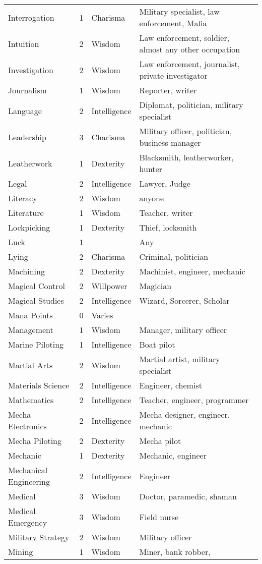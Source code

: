 \documentclass[twoside]{book}
\begin{document}
\begin{longtable}{p{1.25in}llp{12em}}
      \raggedright  Interrogation& 1& Charisma& Military specialist, law
           enforcement, Mafia\tabularnewline
      \raggedright  Intuition& 2& Wisdom& Law enforcement, soldier,
           almost any other occupation\tabularnewline
      \raggedright  Investigation& 2& Wisdom& Law enforcement,
           journalist, private investigator\tabularnewline
      \raggedright  Journalism& 1& Wisdom& Reporter, writer\tabularnewline
      \raggedright  Language& 2& Intelligence& Diplomat, politician,
           military specialist\tabularnewline
      \raggedright  Leadership& 3& Charisma& Military officer,
           politician, business manager\tabularnewline
      \raggedright  Leatherwork& 1& Dexterity& Blacksmith,
           leatherworker, hunter\tabularnewline
      \raggedright  Legal& 2& Intelligence& Lawyer, Judge\tabularnewline
      \raggedright  Literacy& 2& Wisdom& anyone\tabularnewline
      \raggedright  Literature& 1& Wisdom& Teacher, writer\tabularnewline
      \raggedright  Lockpicking& 1& Dexterity& Thief, locksmith\tabularnewline
      \raggedright  Luck& 1& & Any\tabularnewline
      \raggedright  Lying& 2& Charisma& Criminal, politician\tabularnewline
      \raggedright  Machining& 2& Dexterity& Machinist, engineer,
           mechanic\tabularnewline
      \raggedright  Magical Control& 2& Willpower& Magician\tabularnewline
      \raggedright  Magical Studies& 2& Intelligence& Wizard, Sorcerer, Scholar\tabularnewline
      \raggedright  Mana Points& 0& Varies&\tabularnewline
      \raggedright  Management& 1& Wisdom& Manager, military officer\tabularnewline
      \raggedright  Marine Piloting& 1& Intelligence& Boat pilot\tabularnewline
      \raggedright  Martial Arts& 2& Wisdom& Martial artist, military
           specialist\tabularnewline
      \raggedright  Materials Science& 2& Intelligence& Engineer, chemist\tabularnewline
      \raggedright  Mathematics& 2& Intelligence& Teacher, engineer,
           programmer\tabularnewline
      \raggedright  Mecha Electronics& 2& Intelligence& Mecha designer, engineer,
           mechanic\tabularnewline
      \raggedright  Mecha Piloting& 2& Dexterity& Mecha pilot\tabularnewline
      \raggedright  Mechanic& 1& Dexterity& Mechanic, engineer\tabularnewline
      \raggedright  Mechanical Engineering& 2& Intelligence& Engineer\tabularnewline
      \raggedright  Medical& 3& Wisdom& Doctor, paramedic, shaman\tabularnewline
      \raggedright  Medical Emergency& 3& Wisdom& Field nurse\tabularnewline
      \raggedright  Military Strategy& 2& Wisdom& Military officer\tabularnewline
      \raggedright  Mining& 1& Wisdom& Miner, bank robber,

\end{longtable}
\end{document}
